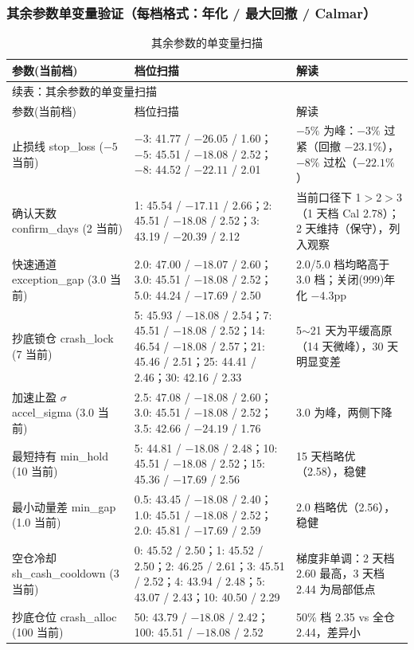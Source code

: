 \documentclass[11pt]{ctexart}
\begin{document}
\subsubsection{其余参数单变量验证（每档格式：年化 / 最大回撤 / Calmar）}

\setlength{\tabcolsep}{4.5pt}
\begin{longtable}{p{2.4cm}p{6.5cm}p{5.9cm}}
\caption{其余参数的单变量扫描}\\
\toprule
参数(当前档) & 档位扫描 & 解读 \\
\midrule
\endfirsthead
\multicolumn{3}{l}{\footnotesize 续表：其余参数的单变量扫描}\\
\toprule
参数(当前档) & 档位扫描 & 解读 \\
\midrule
\endhead
\bottomrule
\endfoot
\footnotesize
止损线 stop\_loss ($-5$ 当前) &
$-3$: 41.77 / $-26.05$ / 1.60；$-5$: 45.51 / $-18.08$ / 2.52；$-8$: 44.52 / $-22.11$ / 2.01 &
$-5\%$ 为峰：$-3\%$ 过紧（回撤 $-23.1\%$），$-8\%$ 过松（$-22.1\%$） \\
\midrule
确认天数 confirm\_days (2 当前) &
1: 45.54 / $-17.11$ / 2.66；2: 45.51 / $-18.08$ / 2.52；3: 43.19 / $-20.39$ / 2.12 &
当前口径下 1$>$2$>$3（1 天档 Cal 2.78）；2 天维持（保守），列入观察 \\
\midrule
快速通道 exception\_gap (3.0 当前) &
2.0: 47.00 / $-18.07$ / 2.60；3.0: 45.51 / $-18.08$ / 2.52；5.0: 44.24 / $-17.69$ / 2.50 &
2.0/5.0 档均略高于 3.0 档；关闭(999)年化 $-4.3$pp \\
\midrule
抄底锁仓 crash\_lock (7 当前) &
5: 45.93 / $-18.08$ / 2.54；7: 45.51 / $-18.08$ / 2.52；14: 46.54 / $-18.08$ / 2.57；21: 45.46 / 2.51；25: 44.41 / 2.46；30: 42.16 / 2.33 &
5$\sim$21 天为平缓高原（14 天微峰），30 天明显变差 \\
\midrule
加速止盈 $\sigma$ accel\_sigma (3.0 当前) &
2.5: 47.08 / $-18.08$ / 2.60；3.0: 45.51 / $-18.08$ / 2.52；3.5: 42.66 / $-24.19$ / 1.76 &
3.0 为峰，两侧下降 \\
\midrule
最短持有 min\_hold (10 当前) &
5: 44.81 / $-18.08$ / 2.48；10: 45.51 / $-18.08$ / 2.52；15: 45.36 / $-17.69$ / 2.56 &
15 天档略优（2.58），稳健 \\
\midrule
最小动量差 min\_gap (1.0 当前) &
0.5: 43.45 / $-18.08$ / 2.40；1.0: 45.51 / $-18.08$ / 2.52；2.0: 45.81 / $-17.69$ / 2.59 &
2.0 档略优（2.56），稳健 \\
\midrule
空仓冷却 sh\_cash\_\allowbreak cooldown (3 当前) &
0: 45.52 / 2.50；1: 45.52 / 2.50；2: 46.25 / 2.61；3: 45.51 / 2.52；4: 43.94 / 2.48；5: 43.07 / 2.43；10: 40.50 / 2.29 &
梯度非单调：2 天档 2.60 最高，3 天档 2.44 为局部低点 \\
\midrule
抄底仓位 crash\_alloc (100 当前) &
50: 43.79 / $-18.08$ / 2.42；100: 45.51 / $-18.08$ / 2.52 &
50\% 档 2.35 vs 全仓 2.44，差异小 \\
\bottomrule
\end{longtable}
\end{document}
